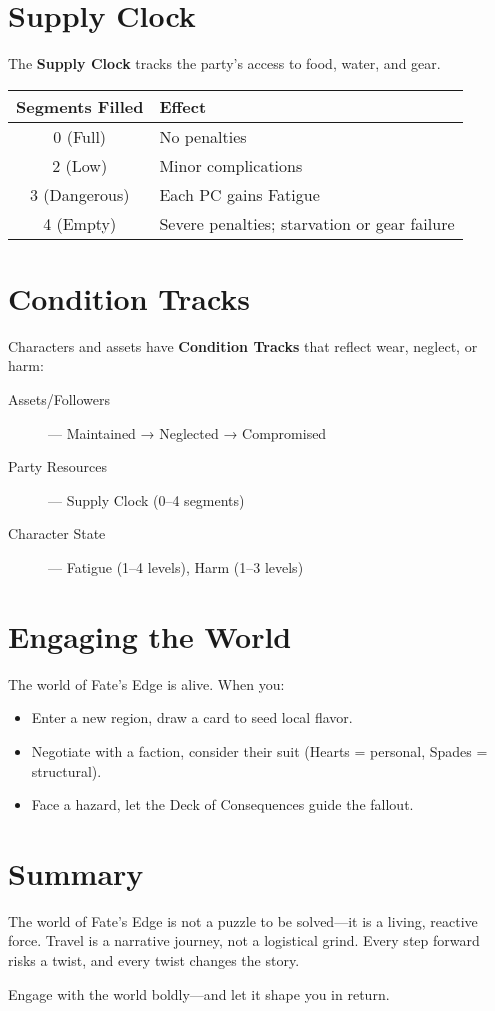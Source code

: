 \section{Supply Clock}

The \textbf{Supply Clock} tracks the party’s access to food, water, and gear.

\begin{center}
\begin{tabular}{cl}
\toprule
\textbf{Segments Filled} & \textbf{Effect} \\
\midrule
0 (Full) & No penalties \\
2 (Low) & Minor complications \\
3 (Dangerous) & Each PC gains Fatigue \\
4 (Empty) & Severe penalties; starvation or gear failure \\
\bottomrule
\end{tabular}
\end{center}

\section{Condition Tracks}

Characters and assets have \textbf{Condition Tracks} that reflect wear, neglect, or harm:

\begin{description}
  \item[Assets/Followers] — Maintained → Neglected → Compromised
  \item[Party Resources] — Supply Clock (0–4 segments)
  \item[Character State] — Fatigue (1–4 levels), Harm (1–3 levels)
\end{description}

\section{Engaging the World}

The world of Fate’s Edge is alive. When you:

\begin{itemize}
  \item Enter a new region, draw a card to seed local flavor.
  \item Negotiate with a faction, consider their suit (Hearts = personal, Spades = structural).
  \item Face a hazard, let the Deck of Consequences guide the fallout.
\end{itemize}

\section{Summary}

The world of Fate’s Edge is not a puzzle to be solved—it is a living, reactive force. Travel is a narrative journey, not a logistical grind. Every step forward risks a twist, and every twist changes the story.

Engage with the world boldly—and let it shape you in return.


